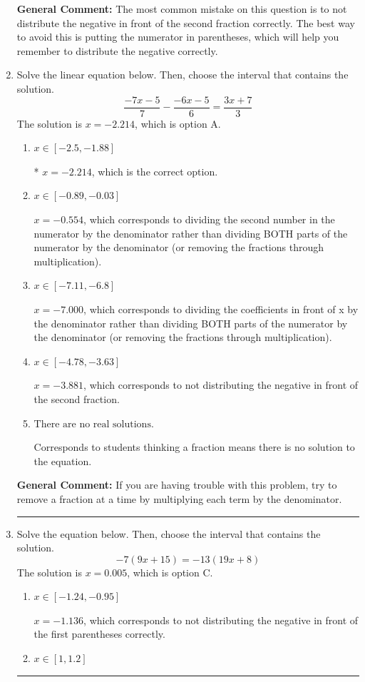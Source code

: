 \documentclass{extbook}[14pt]
\newcommand{\litem}[1]{\item #1

\rule{\textwidth}{0.4pt}}
\begin{document}
\begin{enumerate}
{\textbf{General Comment:} The most common mistake on this question is to not distribute the negative in front of the second fraction correctly. The best way to avoid this is putting the numerator in parentheses, which will help you remember to distribute the negative correctly.
}
\litem{
Solve the linear equation below. Then, choose the interval that contains the solution.
\[ \frac{-7x -5}{7} - \frac{-6x -5}{6} = \frac{3x + 7}{3} \]The solution is \( x = -2.214 \), which is option A.\begin{enumerate}[label=\Alph*.]
\item \( x \in [-2.5, -1.88] \)

* $x = -2.214$, which is the correct option.
\item \( x \in [-0.89, -0.03] \)

 $x = -0.554$, which corresponds to dividing the second number in the numerator by the denominator rather than dividing BOTH parts of the numerator by the denominator (or removing the fractions through multiplication).
\item \( x \in [-7.11, -6.8] \)

 $x = -7.000$, which corresponds to dividing the coefficients in front of x by the denominator rather than dividing BOTH parts of the numerator by the denominator (or removing the fractions through multiplication).
\item \( x \in [-4.78, -3.63] \)

 $x = -3.881$, which corresponds to not distributing the negative in front of the second fraction.
\item \( \text{There are no real solutions.} \)

Corresponds to students thinking a fraction means there is no solution to the equation.
\end{enumerate}

\textbf{General Comment:} If you are having trouble with this problem, try to remove a fraction at a time by multiplying each term by the denominator.
}
\litem{
Solve the equation below. Then, choose the interval that contains the solution.
\[ -7(9x + 15) = -13(19x + 8) \]The solution is \( x = 0.005 \), which is option C.\begin{enumerate}[label=\Alph*.]
\item \( x \in [-1.24, -0.95] \)

$x = -1.136$, which corresponds to not distributing the negative in front of the first parentheses correctly.
\item \( x \in [1, 1.2] \)


\end{enumerate}}
\end{enumerate}
\end{document}
